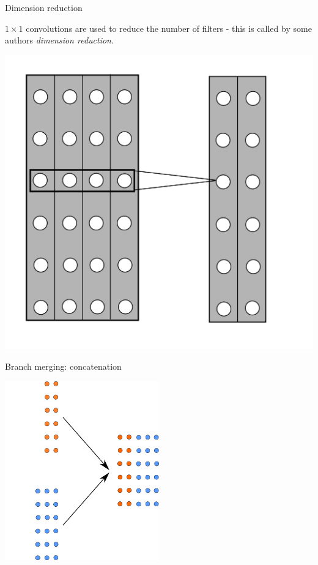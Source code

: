 \documentclass[xcolor=pdftex,dvipsnames,table,mathserif]{beamer}
\begin{document}
\begin{frame}{Dimension reduction}

  $1 \times 1$ convolutions are used to reduce the number of filters - this is called by some authors \emph{dimension reduction}.

  \begin{center}
    \includegraphics[height=0.5\textheight]{conv1x1.png}
  \end{center}

\end{frame}


\begin{frame}{Branch merging: concatenation}

  \begin{center}
    \includegraphics[width=0.5\textwidth]{concatenation.png}
  \end{center}

\end{frame}
\end{document}
